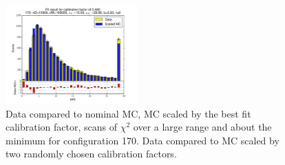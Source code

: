 \begin{figure}[htbp]
\begin{center}
\includegraphics[width=0.45\textwidth]{../FIGURES/170/FIG_Fit_result_for_calibration_factor_of_0_480.pdf} 
\caption{Data compared to nominal MC, MC scaled by the best fit calibration factor, scans of $\chi^2$ over a large range and about the minimum for configuration 170. Data compared to MC scaled by two randomly chosen calibration factors.} 
\label{tab:best_170} 
\end{center} \end{figure} 

